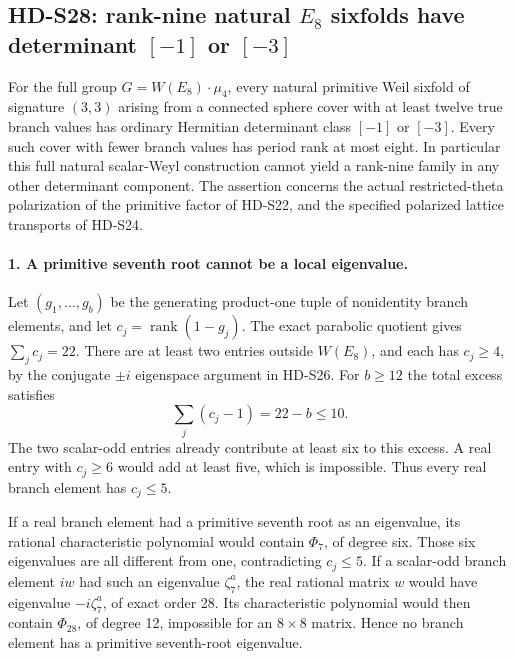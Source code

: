 \subsection{HD-S28: rank-nine natural \(E_8\) sixfolds have determinant \([-1]\) or \([-3]\)}
\label{sec:e8-determinant-scope}

For the full group \(G=W(E_8)\cdot\mu_4\), every natural
primitive Weil sixfold of signature \((3,3)\) arising from a
connected sphere cover with at least twelve true branch values has
ordinary Hermitian determinant class \([-1]\) or \([-3]\).
Every such cover with fewer branch values has period rank at most
eight. In particular this full natural scalar-Weyl construction
cannot yield a rank-nine family in any other determinant component.
The assertion concerns the actual restricted-theta polarization of
the primitive factor of HD-S22, and the specified polarized lattice
transports of HD-S24.

\paragraph{1. A primitive seventh root cannot be a local eigenvalue.}
Let \((g_1,\ldots,g_b)\) be the generating product-one tuple of
nonidentity branch elements, and let \(c_j=\operatorname{rank}(1-g_j)\).
The exact parabolic quotient gives \(\sum_jc_j=22\). There are
at least two entries outside \(W(E_8)\), and each has
\(c_j\ge4\), by the conjugate \(\pm i\) eigenspace argument
in HD-S26. For \(b\ge12\) the total excess satisfies
\[
 \sum_j(c_j-1)=22-b\le10.
\]
The two scalar-odd entries already contribute at least six to this
excess. A real entry with \(c_j\ge6\) would add at least five,
which is impossible. Thus every real branch element has
\(c_j\le5\).

If a real branch element had a primitive seventh root as an
eigenvalue, its rational characteristic polynomial would contain
\(\Phi_7\), of degree six. Those six eigenvalues are all different
from one, contradicting \(c_j\le5\). If a scalar-odd branch
element \(iw\) had such an eigenvalue \(\zeta_7^a\), the
real rational matrix \(w\) would have eigenvalue
\(-i\zeta_7^a\), of exact order 28. Its characteristic polynomial
would then contain \(\Phi_{28}\), of degree 12, impossible for
an \(8\times8\) matrix. Hence no branch element has a primitive
seventh-root eigenvalue.

